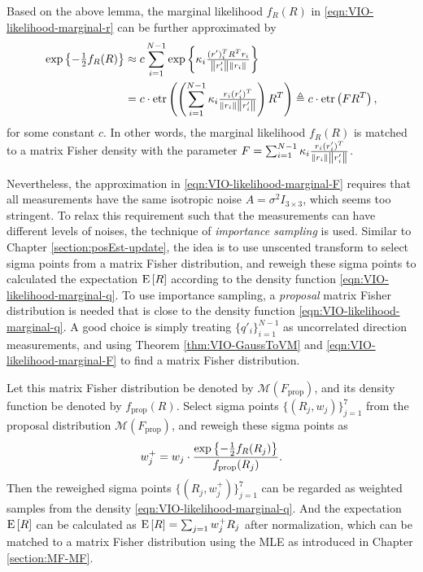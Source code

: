 Based on the above lemma, the marginal likelihood $f_R(R)$ in \eqref{eqn:VIO-likelihood-marginal-r} can be further approximated by
\begin{align} \label{eqn:VIO-likelihood-marginal-F}
	\exp\left\{ -\tfrac{1}{2}f_R(R) \right\} &\approx c \sum_{i=1}^{N-1} \exp\left\{ \kappa_i \tfrac{(r')_i^TR^Tr_i}{\left\| r'_i \right\|\left\| r_i \right\|} \right\} \nonumber \\ 
	&= c \cdot \mathrm{etr}\left( \left(\sum_{i=1}^{N-1} \kappa_i \tfrac{r_i(r'_i)^T}{\left\| r_i \right\|\left\| r'_i \right\|}\right) R^T \right) \triangleq c \cdot \mathrm{etr}\left( FR^T \right),
\end{align}
for some constant $c$.
In other words, the marginal likelihood $f_R(R)$ is matched to a matrix Fisher density with the parameter $F = \sum_{i=1}^{N-1} \kappa_i \tfrac{r_i(r'_i)^T}{\left\| r_i \right\|\left\| r'_i \right\|}$.

Nevertheless, the approximation in \eqref{eqn:VIO-likelihood-marginal-F} requires that all measurements have the same isotropic noise $A = \sigma^2I_{3\times 3}$, which seems too stringent.
To relax this requirement such that the measurements can have different levels of noises, the technique of \textit{importance sampling} is used.
Similar to Chapter \ref{section:posEst-update}, the idea is to use unscented transform to select sigma points from a matrix Fisher distribution, and reweigh these sigma points to calculated the expectation $\mathrm{E}\left[ R \right]$ according to the density function \eqref{eqn:VIO-likelihood-marginal-q}.
To use importance sampling, a \textit{proposal} matrix Fisher distribution is needed that is close to the density function \eqref{eqn:VIO-likelihood-marginal-q}.
A good choice is simply treating $\{q'_i\}_{i=1}^{N-1}$ as uncorrelated direction measurements, and using Theorem \ref{thm:VIO-GaussToVM} and \eqref{eqn:VIO-likelihood-marginal-F} to find a matrix Fisher distribution.

Let this matrix Fisher distribution be denoted by $\mathcal{M}(F_\text{prop})$, and its density function be denoted by $f_\text{prop}(R)$.
Select sigma points \cite{gilitschenski2015unscented,lee2018bayesian} $\{(R_j,w_j)\}_{j=1}^7$ from the proposal distribution $\mathcal{M}(F_\text{prop})$, and reweigh these sigma points as
\begin{align} \label{eqn:VIO-update-sigmapoints}
	w_j^+ = w_j \cdot \frac{\exp\left\{ -\tfrac{1}{2}f_R(R_j) \right\}}{f_\text{prop}(R_j)}.
\end{align}
Then the reweighed sigma points $\{(R_j,w_j^+)\}_{j=1}^7$ can be regarded as weighted samples from the density \eqref{eqn:VIO-likelihood-marginal-q}.
And the expectation $\mathrm{E}\left[ R \right]$ can be calculated as $\mathrm{E}\left[ R \right] = \sum_{j=1} w_j^+R_j$ after normalization, which can be matched to a matrix Fisher distribution using the MLE as introduced in Chapter \ref{section:MF-MF}.

